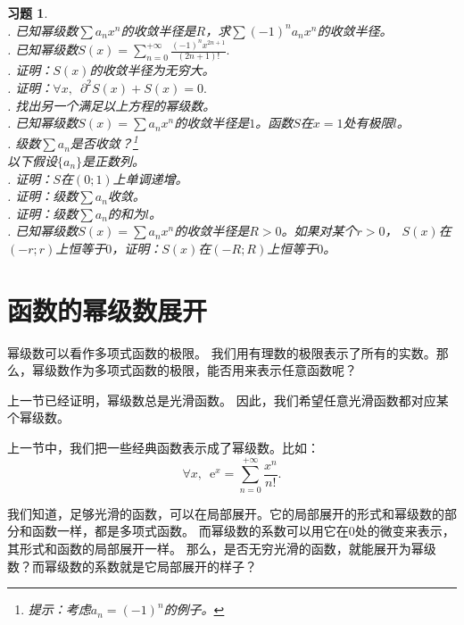 \documentclass[12pt,UTF8]{ctexbook}
\theoremstyle{definition}
\theoremstyle{plain}
\newtheorem{xt}{习题}[section]
\begin{document}
\begin{xt}    
    \mbox{} \\
    . 已知幂级数$\sum a_n x^n$的收敛半径是$R$，求$\sum (-1)^n a_n x^n$的收敛半径。\\
    . 已知幂级数$S(x) = \sum_{n=0}^{+\infty} \frac{(-1)^n x^{2n+1}}{(2n+1)!}. $\\
    . 证明：$S(x)$的收敛半径为无穷大。\\
    . 证明：$\forall x,\,\,\,\partial^2 S(x) + S(x) = 0.$ \\
    . 找出另一个满足以上方程的幂级数。\\
    . 已知幂级数$S(x) = \sum a_n x^n$的收敛半径是$1$。函数$S$在$x=1$处有极限$l$。\\
    . 级数$\sum a_n$是否收敛？\footnote{提示：考虑$a_n = (-1)^n$的例子。}\\
    \indent 以下假设$\{a_n\}$是正数列。\\
    . 证明：$S$在$(0;1)$上单调递增。\\
    . 证明：级数$\sum a_n$收敛。\\
    . 证明：级数$\sum a_n$的和为$l$。\\
    . 已知幂级数$S(x) = \sum a_n x^n$的收敛半径是$R>0$。如果对某个$r>0$，
    $S(x)$在$(-r;r)$上恒等于$0$，证明：$S(x)$在$(-R;R)$上恒等于$0$。
\end{xt}

\section{函数的幂级数展开}

幂级数可以看作多项式函数的极限。
我们用有理数的极限表示了所有的实数。那么，幂级数作为多项式函数的极限，能否用来表示任意函数呢？

上一节已经证明，幂级数总是光滑函数。
因此，我们希望任意光滑函数都对应某个幂级数。

上一节中，我们把一些经典函数表示成了幂级数。比如：
$$ \forall x, \,\,\, \mathrm{e}^x = \sum_{n=0}^{+\infty} \frac{x^n}{n!}. $$

我们知道，足够光滑的函数，可以在局部展开。它的局部展开的形式和幂级数的部分和函数一样，都是多项式函数。
而幂级数的系数可以用它在$0$处的微变来表示，其形式和函数的局部展开一样。
那么，是否无穷光滑的函数，就能展开为幂级数？而幂级数的系数就是它局部展开的样子？
\end{document}
